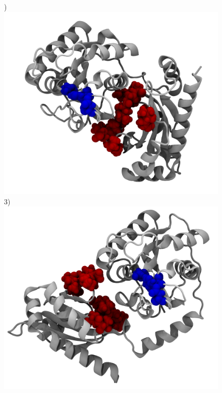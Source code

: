 \documentclass[english, a4paper, 12pt, titlepage, draft]{article}
\begin{document}
\begin{figure}
    \begin{minipage}[]{0.45\linewidth}
        )
        \includegraphics[width=\textwidth]{figures/Complex_structures/structure1.png}  
        3)
        \includegraphics[width=\textwidth]{figures/Complex_structures/structure3.png}  
    \end{minipage}
\hspace{0.5cm}
    \begin{minipage}[]{0.45\linewidth}

\end{minipage}
\end{figure}
\end{document}
